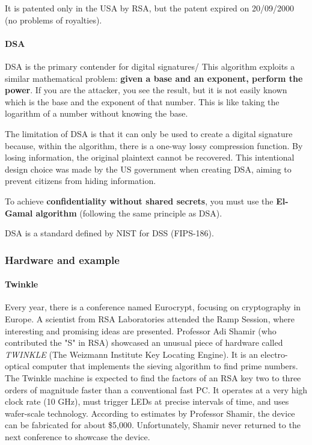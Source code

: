 It is patented only in the USA
by RSA, but the patent expired on 20/09/2000 (no problems of royalties).


\paragraph{DSA}
DSA is the primary contender for digital signatures/ This algorithm exploits a similar mathematical problem: \textbf{given a base and an exponent, perform the power}. If you are the attacker, you see the result, but it is not easily known which is the base and the exponent of that number. This is like taking the logarithm of a number without knowing the base.

The limitation of DSA is that it can only be used to create a digital signature because, within the algorithm, there is a one-way lossy compression function. By losing information, the original plaintext cannot be recovered. This intentional design choice was made by the US government when creating DSA, aiming to prevent citizens from hiding information.

To achieve \textbf{confidentiality without shared secrets}, you must use the \textbf{El-Gamal algorithm} (following the same principle as DSA).

DSA is a standard defined by NIST for DSS (FIPS-186).



\subsubsection{Hardware and example}

\paragraph{Twinkle}
Every year, there is a conference named Eurocrypt, focusing on cryptography in Europe. A scientist from RSA Laboratories attended the Ramp Session, where interesting and promising ideas are presented. Professor Adi Shamir (who contributed the "S" in RSA) showcased an unusual piece of hardware called \textit{TWINKLE} (The Weizmann Institute Key Locating Engine). It is an electro-optical computer that implements the sieving algorithm to find prime numbers. The Twinkle machine is expected to find the factors of an RSA key two to three orders of magnitude faster than a conventional fast PC. It operates at a very high clock rate (10 GHz), must trigger LEDs at precise intervals of time, and uses wafer-scale technology. According to estimates by Professor Shamir, the device can be fabricated for about \$5,000. Unfortunately, Shamir never returned to the next conference to showcase the device.

